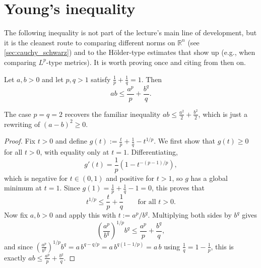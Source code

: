 \section{Young's inequality}
\label{sec:youngs_inequality}

The following inequality is not part of the lecture's main line of development, but it is the
cleanest route to comparing different norms on $\mathbb{R}^n$ (see \cref{sec:cauchy_schwarz}) and to
the Hölder-type estimates that show up (e.g., when comparing $L^p$-type metrics). It is worth proving
once and citing from then on.

\begin{proposition}
\label{prop:youngs_inequality}
Let $a, b > 0$ and let $p, q > 1$ satisfy $\tfrac{1}{p} + \tfrac{1}{q} = 1$. Then
\[
  ab \leq \frac{a^p}{p} + \frac{b^q}{q}.
\]
\end{proposition}

\begin{remark}
The case $p = q = 2$ recovers the familiar inequality $ab \leq \tfrac{a^2}{2} + \tfrac{b^2}{2}$,
which is just a rewriting of $(a-b)^2 \geq 0$.
\end{remark}

\begin{proof}
Fix $t > 0$ and define $g(t) := \tfrac{t}{p} + \tfrac{1}{q} - t^{1/p}$. We first show that
$g(t) \geq 0$ for all $t > 0$, with equality only at $t = 1$. Differentiating,
\[
  g'(t) = \frac{1}{p}\left(1 - t^{-(p-1)/p}\right),
\]
which is negative for $t \in (0,1)$ and positive for $t > 1$, so $g$ has a global minimum at
$t = 1$. Since $g(1) = \tfrac{1}{p} + \tfrac{1}{q} - 1 = 0$, this proves that
\[
  t^{1/p} \leq \frac{t}{p} + \frac{1}{q} \qquad \text{for all } t > 0.
\]
Now fix $a, b > 0$ and apply this with $t := a^p / b^q$. Multiplying both sides by $b^q$ gives
\[
  \left(\frac{a^p}{b^q}\right)^{1/p} b^q \leq \frac{a^p}{p} + \frac{b^q}{q},
\]
and since $\left(\tfrac{a^p}{b^q}\right)^{1/p} b^q = a\, b^{q - q/p} = a\,b^{q(1 - 1/p)} = a\,b$
using $\tfrac{1}{q} = 1 - \tfrac{1}{p}$, this is exactly $ab \leq \tfrac{a^p}{p} + \tfrac{b^q}{q}$.
\end{proof}

